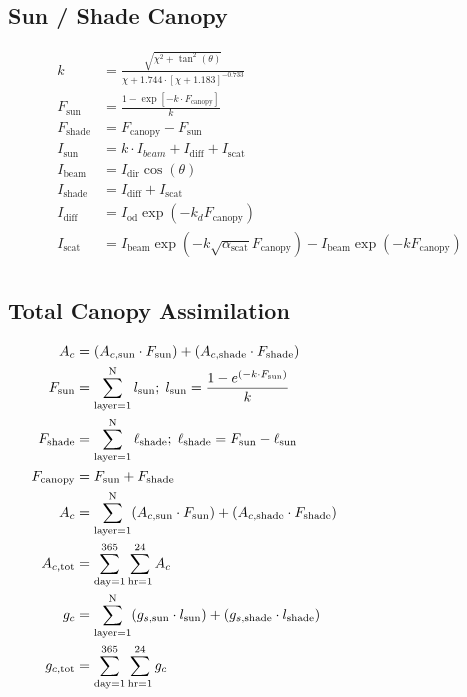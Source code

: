 \documentclass[10pt]{article}
\begin{document}
\subsection*{Sun / Shade Canopy}
\begin{align}
 k &= \frac{\sqrt{\chi^2 + \tan^2(\theta)}}{\chi + 1.744 \cdot[\chi + 1.183]^{-0.733}} \label{eqn:k} \\
 F_\text{sun} &=  \frac{1 - \exp[-k\cdot F_\text{canopy}]}{k} \label{eqn:Fsun} \\
 F_\text{shade} &= F_{\text{canopy}} - F_{\text{sun}} \label{eqn:Fshade} \\
 I_\text{sun} &= k\cdot I_{beam} + I_\text{diff} + I_\text{scat} \label{eqn:Isun} \\
I_\text{beam} &= I_\text{dir}\cos(\theta)\\
 I_\text{shade} &= I_{\text{diff}} + I_\text{scat} \label{eqn:Ishade} \\
I_\text{diff} & = I_\text{od} \exp(-k_dF_\text{canopy})\\
 I_{\text{scat}} &= I_\text{beam} \exp(-k \sqrt{\alpha_\text{scat}}F_\text{canopy})- I_\text{beam}\exp(-kF_\text{canopy}) \label{eqn:Iscat}\\
\end{align}

\subsection*{Total Canopy Assimilation}
\begin{align}
 A_c &= (A_{c,\text{sun}}\cdot F_{\text{sun}}) + (A_{c,\text{shade}} \cdot F_{\text{shade}}) \label{eqn:Ac} \\
 F_{\text{sun}} &= \sum_{\text{layer}=1}^\text{N} l_{\text{sun}} ; \;  l_{\text{sun}} = \frac{1-e^{(-k\cdot F_{\text{sun}})}}{k} \label{eqn:Fsun2} \\
 F_{\text{shade}} &= \sum_{\text{layer}=1}^\text{N} \ell_{\text{shade}}; \; \ell_{\text{shade}}=F_{\text{sun}}-\ell_{\text{sun}} \label{eqn:Fshade2} \\
 F_{\text{canopy}} &= F_{\text{sun}} + F_{\text{shade}} \hspace{3.1in} \label{eqn:Fcanopy2}\\
 A_c &= \sum_{\text{layer}=1}^\text{N} (A_{c,\text{sun}} \cdot F_{\text{sun}}) + (A_{c,\text{shade}} \cdot F_{\text{shade}}) \label{eqn:Ac2} \\
 A_{c,\text{tot}} &= \sum_{\text{day}=1}^{365}\sum_{\text{hr}=1}^{24} A_c \label{eqn:Actot} \\
 g_c &= \sum_{\text{layer}=1}^\text{N}(g_{s,\text{sun}}\cdot l_{\text{sun}}) + (g_{s,\text{shade}}\cdot l_{\text{shade}}) \label{eqn:gc}\\ 
 g_{c,\text{tot}} &= \sum_{\text{day}=1}^{365}\sum_{\text{hr}=1}^{24}g_c \label{eqn:gctot} 
\end{align}
\end{document}
